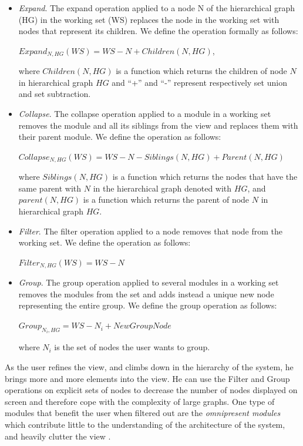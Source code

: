 \documentclass[preprint,12pt]{elsarticle}
\begin{document}
\begin{itemize}

\item {\em Expand}. The expand operation applied to a node N of the hierarchical graph (HG) in the working set (WS) replaces the node in the working set with nodes that represent its children. We define the operation formally as follows: 

$ Expand_{N,HG} (WS) = WS - N + Children (N, HG)$, 

where $Children(N,HG)$ is a function which returns the children of node $N$ in hierarchical graph $HG$ and ``+'' and ``-'' represent respectively set union and set subtraction.

\item {\em Collapse}. The collapse operation applied to a module in a working set removes the module and all its siblings from the view and replaces them with their parent module. We define the operation as follows:

$ Collapse_{N,HG} (WS) = WS - N - Siblings (N, HG) + Parent (N, HG)$

where $Siblings(N, HG)$ is a function which returns the nodes that have the same parent with $N$ in the hierarchical graph denoted with $HG$, and $parent(N,HG)$ is a function which returns the parent of node $N$ in hierarchical graph $HG$. 

\item {\em Filter}. The filter operation applied to a node removes that node from the working set. We define the operation as follows:

$ Filter_{N,HG} (WS) = WS - N$

\item {\em Group}. The group operation applied to several modules in a working set removes the modules from the set and adds instead a unique new node representing the entire group. We define the group operation as follows: 

$ Group_{N_{i},HG} = WS - N_i + NewGroupNode $

where $N_i$ is the set of nodes the user wants to group.

\end{itemize}

As the user refines the view, and climbs down in the hierarchy of the system, he brings more and more elements into the view. He can use the Filter and Group operations on explicit sets of nodes to decrease the number of nodes displayed on screen and therefore cope with the complexity of large graphs. One type of modules that benefit the user when filtered out are the {\em omnipresent modules} which contribute little to the understanding of the architecture of the system, and heavily clutter the view \cite{mitchell-bunch}.
\end{document}

